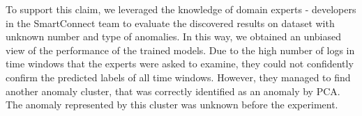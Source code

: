 To support this claim, we leveraged the knowledge of domain experts - developers in the SmartConnect team to evaluate the discovered results on dataset with unknown number and type of anomalies. In this way, we obtained an unbiased view of the performance of the trained models. Due to the high number of logs in time windows that the experts were asked to examine, they could not confidently confirm the predicted labels of all time windows. However, they managed to find another anomaly cluster, that was correctly identified as an anomaly by PCA. The anomaly represented by this cluster was unknown before the experiment.
